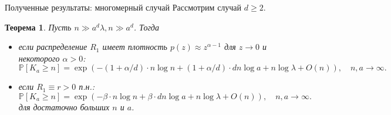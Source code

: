 \documentclass[aspectratio=1610]{beamer}
\theoremstyle{plain}
\newtheorem{thm}{Теорема} %
\theoremstyle{definition}
\theoremstyle{remark}
\def\geq{\geqslant}
\newcommand{\PP}{\mathbb{P}}
\begin{document}

    



\begin{frame}{Полученные результаты: многомерный случай}
Рассмотрим случай $d \geq 2$.
\begin{thm}
Пусть $n\gg a^d\lambda, n\gg a^d$. Тогда
\begin{itemize}
    \item если распределение $R_1$ имеет плотность $p(z)\approx z^{\alpha-1}$ для $z\to 0$ и некоторого $\alpha > 0$:
    \begin{equation*}
    \PP[K_a\geq n] = \exp(-(1+\alpha/d)\cdot n\log n + (1+\alpha/d) \cdot dn\log a 
    +n\log\lambda +O(n)),\quad 
    n,a \to\infty.
\end{equation*}
\item если $R_1\equiv r>0$ п.н.:
\begin{equation*}
    \PP[K_a\geq n] = \exp(-\beta \cdot n\log n + \beta\cdot dn\log a 
    +n\log\lambda +O(n)),\quad 
    n,a \to\infty.
\end{equation*}
для достаточно больших  $n$ и $a$.
\end{itemize}
\end{thm}


\end{frame}{}
\end{document}
